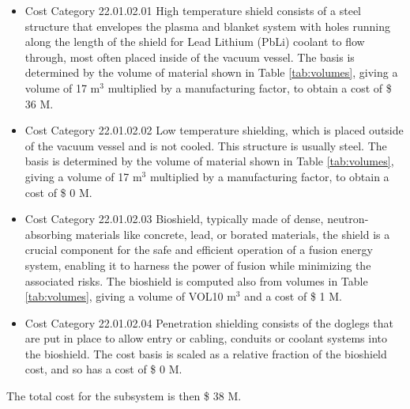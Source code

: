 \begin{itemize}
    \item Cost Category 22.01.02.01 High temperature shield consists of a steel structure that envelopes the plasma and blanket system with holes running along the length of the shield for Lead Lithium (PbLi) coolant to flow through, most often placed inside of the vacuum vessel. The basis is determined by the volume of material shown in Table \ref{tab:volumes}, giving a volume of 17  m$^{3}$ multiplied by a manufacturing factor, to obtain a cost of \$ 36 M. %
    \item Cost Category 22.01.02.02 Low temperature shielding, which is placed outside of the vacuum vessel and is not cooled.  This structure is usually steel.  The basis is determined by the volume of material shown in Table \ref{tab:volumes}, giving a volume of 17  m$^{3}$ multiplied by a manufacturing factor, to obtain a cost of \$ 0 M.
    \item Cost Category 22.01.02.03 Bioshield, typically made of dense, neutron-absorbing materials like concrete, lead, or borated materials, the shield is a crucial component for the safe and efficient operation of a fusion energy system, enabling it to harness the power of fusion while minimizing the associated risks.  The bioshield is computed also from volumes in Table \ref{tab:volumes}, giving a volume of VOL10 m$^{3}$ and a cost of \$ 1 M. 
    \item Cost Category 22.01.02.04 Penetration shielding consists of the doglegs that are put in place to allow entry or cabling, conduits or coolant systems into the bioshield.  The cost basis is scaled as a relative fraction of the bioshield cost, and so has a cost of \$ 0 M.
\end{itemize}

The total cost for the subsystem is then \$ 38 M.




